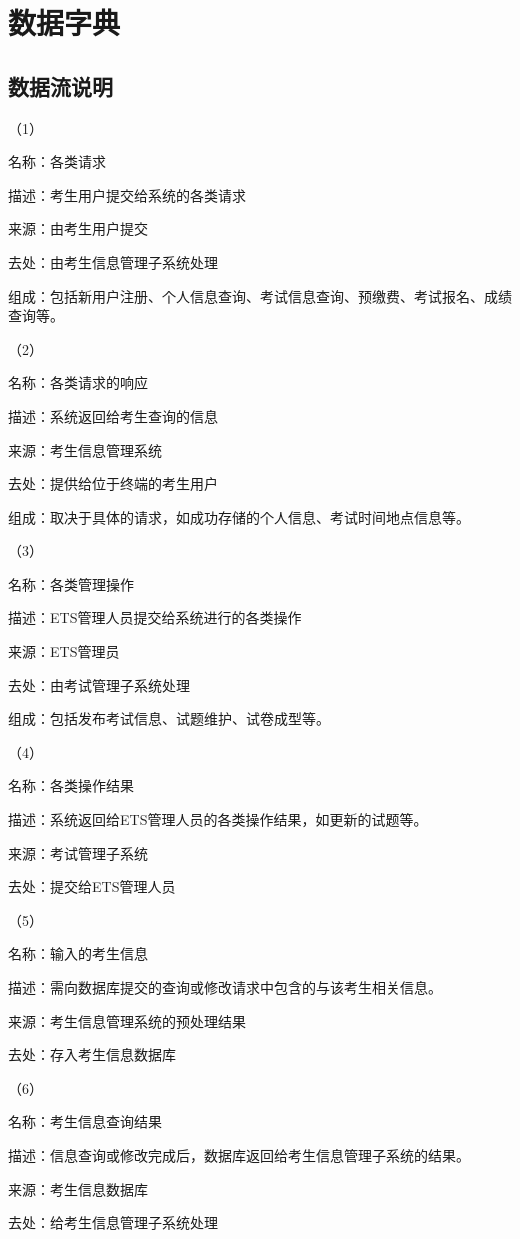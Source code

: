 \section{数据字典}
\subsection{数据流说明}
（1）

名称：各类请求

描述：考生用户提交给系统的各类请求

来源：由考生用户提交

去处：由考生信息管理子系统处理

组成：包括新用户注册、个人信息查询、考试信息查询、预缴费、考试报名、成绩查询等。

（2）

名称：各类请求的响应

描述：系统返回给考生查询的信息

来源：考生信息管理系统

去处：提供给位于终端的考生用户

组成：取决于具体的请求，如成功存储的个人信息、考试时间地点信息等。

（3）

名称：各类管理操作

描述：ETS管理人员提交给系统进行的各类操作

来源：ETS管理员

去处：由考试管理子系统处理

组成：包括发布考试信息、试题维护、试卷成型等。

（4）

名称：各类操作结果

描述：系统返回给ETS管理人员的各类操作结果，如更新的试题等。

来源：考试管理子系统

去处：提交给ETS管理人员

（5）

名称：输入的考生信息

描述：需向数据库提交的查询或修改请求中包含的与该考生相关信息。

来源：考生信息管理系统的预处理结果

去处：存入考生信息数据库

（6）

名称：考生信息查询结果

描述：信息查询或修改完成后，数据库返回给考生信息管理子系统的结果。

来源：考生信息数据库

去处：给考生信息管理子系统处理

